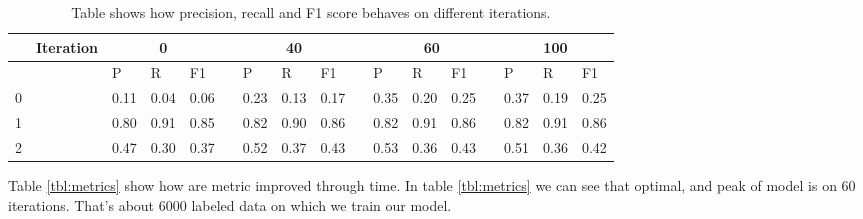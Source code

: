 \documentclass[10pt, a4paper]{article}
\begin{document}
\begin{table}[t!]
	\centering
	\caption{Table shows how precision, recall and F1 score behaves on different iterations.}
	\label{tbl:Scores}
	\begin{tabular}{lllllllllllllllll}
		\hline
		& Iteration             & \multicolumn{3}{c}{0}                                                             &                       & \multicolumn{3}{c}{40}                                                            &                       & \multicolumn{4}{c}{60}                                                                                    & \multicolumn{3}{c}{100} \\ \hline
		\multicolumn{1}{l}{}  & \multicolumn{1}{l}{} & \multicolumn{1}{l}{P}    & \multicolumn{1}{l}{R}    & \multicolumn{1}{l}{F1}   & \multicolumn{1}{l}{} & \multicolumn{1}{l}{P}    & \multicolumn{1}{l}{R}    & \multicolumn{1}{l}{F1}   & \multicolumn{1}{l}{} & \multicolumn{1}{l}{P}    & \multicolumn{1}{l}{R}    & \multicolumn{1}{l}{F1}   & \multicolumn{1}{l}{} & P      & R      & F1     \\ \hline
		\multicolumn{1}{l}{0} & \multicolumn{1}{l}{} & \multicolumn{1}{l}{0.11} & \multicolumn{1}{l}{0.04} & \multicolumn{1}{l}{0.06} & \multicolumn{1}{l}{} & \multicolumn{1}{l}{0.23} & \multicolumn{1}{l}{0.13} & \multicolumn{1}{l}{0.17} & \multicolumn{1}{l}{} & \multicolumn{1}{l}{0.35} & \multicolumn{1}{l}{0.20} & \multicolumn{1}{l}{0.25} & \multicolumn{1}{l}{} & 0.37   & 0.19   & 0.25   \\ \hline
		\multicolumn{1}{l}{1} & \multicolumn{1}{l}{} & \multicolumn{1}{l}{0.80} & \multicolumn{1}{l}{0.91} & \multicolumn{1}{l}{0.85} & \multicolumn{1}{l}{} & \multicolumn{1}{l}{0.82} & \multicolumn{1}{l}{0.90} & \multicolumn{1}{l}{0.86} & \multicolumn{1}{l}{} & \multicolumn{1}{l}{0.82} & \multicolumn{1}{l}{0.91} & \multicolumn{1}{l}{0.86} & \multicolumn{1}{l}{} & 0.82   & 0.91   & 0.86   \\ \hline
		\multicolumn{1}{l}{2} & \multicolumn{1}{l}{} & \multicolumn{1}{l}{0.47} & \multicolumn{1}{l}{0.30} & \multicolumn{1}{l}{0.37} & \multicolumn{1}{l}{} & \multicolumn{1}{l}{0.52} & \multicolumn{1}{l}{0.37} & \multicolumn{1}{l}{0.43} & \multicolumn{1}{l}{} & \multicolumn{1}{l}{0.53} & \multicolumn{1}{l}{0.36} & \multicolumn{1}{l}{0.43} & \multicolumn{1}{l}{} & 0.51   & 0.36   & 0.42   \\ \hline
	\end{tabular}
\end{table}

Table \ref{tbl:metrics} show how are metric improved through time. In table \ref{tbl:metrics} we can see that optimal, and peak of model is on $60$ iterations. That's about $6000$ labeled data on which we train our model.
\end{document}
